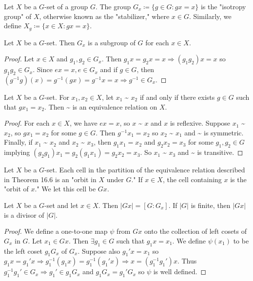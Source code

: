 \documentclass[a4paper,8pt]{article}
\begin{document}
\begin{outline}
    Let \(X\) be a \(G\)-set of a group \(G\). The group \(G_x \coloneqq \{g \in G : gx = x\}\) is
    the "isotropy group" of \(X\), otherwise known as the "stabilizer," where \(x \in G\). Similarly,
    we define \(X_g \coloneqq \{x \in X : gx = x\}\).

    Let \(X\) be a \(G\)-set. Then \(G_x\) is a subgroup of \(G\) for each \(x \in X\).

    \begin{proof}
      Let \(x \in X\) and \(g_1, g_2 \in G_x\). Then \(g_1x = g_2x = x \Rightarrow (g_1g_2)x = x\) so \(g_1g_2 \in G_x\).
      Since \(ex = x, e \in G_x\) and if \(g \in G\), then \((g^{-1}g)(x) = g^{-1}(gx) = g^{-1}x = x \Rightarrow g^{-1}
      \in G_x\).
    \end{proof}

    Let \(X\) be a \(G\)-set. For \(x_1, x_2 \in X\), let \(x_1\) \textasciitilde{} \(x_2\) if and
    only if there exists \(g \in G\) such that \(gx_1 = x_2\). Then \textasciitilde{} is an equivalence
    relation on \(X\).

    \begin{proof}
      For each \(x \in X\), we have \(ex = x\), so \(x\) \textasciitilde{} \(x\) and \(x\) is reflexive. Suppose
      \(x_1\) \textasciitilde{} \(x_2\), so \(gx_1 = x_2\) for some \(g \in G\). Then \(g^{-1}x_1 = x_2\) so \(x_2\)
      \textasciitilde{} \(x_1\) and \textasciitilde{} is symmetric. Finally, if \(x_1\) \textasciitilde{} \(x_2\) and
      \(x_2\) \textasciitilde{} \(x_3\), then \(g_1x_1 = x_2\) and \(g_2x_2 = x_3\) for some \(g_1, g_2 \in G\)
      implying \((g_2g_1)x_1 = g_2(g_1x_1) = g_2x_2 = x_3\). So \(x_1\) \textasciitilde{} \(x_3\) and \textasciitilde{}
      is transitive.
    \end{proof}

    Let \(X\) be a \(G\)-set. Each cell in the partition of the equivalence relation described in Theorem 16.6
    is an "orbit in \(X\) under \(G\)." If \(x \in X\), the cell containing \(x\) is the "orbit of \(x\)." We let
    this cell be \(Gx\).

    Let \(X\) be a \(G\)-set and let \(x \in X\). Then \(|Gx| = [G:G_x]\). If \(|G|\) is finite, then \(|Gx|\)
    is a divisor of \(|G|\).

    \begin{proof}
      We define a one-to-one map \(\psi\) from \(Gx\) onto the collection of left cosets of \(G_x\) in \(G\). Let \(x_1
      \in Gx\). Then \(\exists g_1 \in G\) such that \(g_1x = x_1\). We define \(\psi(x_1)\) to be the left coset \(g_1G_x\)
      of \(G_x\). Suppose also \(g_1'x = x_1\) so \(g_1x = g_1'x \Rightarrow g_1^{-1}(g_1x) = g_1^{-1}(g_1'x) \Rightarrow
      x = (g_1^{-1}g_1')x\). Thus \(g_1^{-1}g_1' \in G_x \Rightarrow g_1' \in g_1G_x\) and \(g_1G_x = g_1'G_x\) so \(\psi\)
      is well defined.


\end{proof}
\end{outline}
\end{document}
